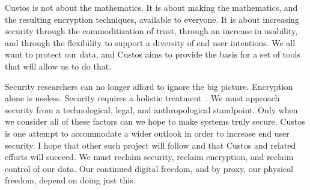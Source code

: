 Custos is not about the mathematics. It is about making the
mathematics, and the resulting encryption techniques, available to
everyone. It is about increasing security through the commoditization
of trust, through an increase in usability, and through the
flexibility to support a diversity of end user intentions. We all want
to protect our data, and Custos aims to provide the basis for a set of
tools that will allow us to do that.

Security researchers can no longer afford to ignore the big
picture. Encryption alone is useless. Security requires a holistic
treatment~\cite{Anderson2001}. We must approach security from a
technological, legal, and anthropological standpoint. Only when we
consider all of these factors can we hope to make systems truly
secure. Custos is one attempt to accommodate a wider outlook in order
to increase end user security. I hope that other such project will
follow and that Custos and related efforts will succeed. We must
reclaim security, reclaim encryption, and reclaim control of our
data. Our continued digital freedom, and by proxy, our physical
freedom, depend on doing just this.

